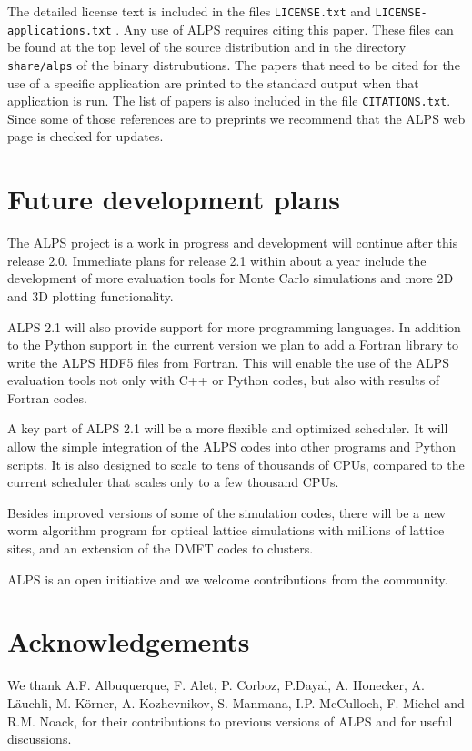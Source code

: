 \documentclass[12pt]{iopart}
\begin{document}
The detailed license text is included in the files {\tt LICENSE.txt} \cite{librarylicense} and {\tt LICENSE-applications.txt}  \cite{applicationlicense}. Any use of ALPS requires citing this paper.  These files can be found at the top level of the source distribution and in the directory {\tt share/alps} of the binary distrubutions. The papers that need to be cited for the use of a specific application are printed to the standard output when that application is run. The list of papers is also included in the file {\tt CITATIONS.txt}. Since some of those references are to preprints we recommend that the ALPS web page \cite{alps} is checked for updates.

\section{Future development plans}

The ALPS project is a work in progress and development will continue after this release 2.0. Immediate plans for release 2.1 within about a year include the development of  more evaluation tools for Monte Carlo simulations and more 2D and 3D plotting functionality.

ALPS 2.1 will also provide support for more programming languages. In addition to the Python support in the current version we plan to add a Fortran library to write the ALPS HDF5 files from Fortran. This will enable the use of the ALPS evaluation tools not only with C++ or Python codes, but also with results of Fortran codes.

A key part of ALPS 2.1 will be a more flexible and optimized scheduler. It will allow  the simple integration of the ALPS codes into other programs and Python scripts. It is also designed to scale to tens of thousands of CPUs, compared to the current scheduler that scales only to a few thousand CPUs. 

Besides improved versions of some of the simulation codes, there will be a new worm algorithm program for optical lattice simulations with millions of lattice sites, and an extension of the DMFT codes to clusters.

ALPS is an open initiative and we welcome contributions from the community.


\section{Acknowledgements}

We thank A.F. Albuquerque, F. Alet, P. Corboz, P.Dayal, A. Honecker, A. L\"auchli, M. K\"orner,  A. Kozhevnikov, S. Manmana, I.P. McCulloch, F. Michel and R.M. Noack, for their contributions to previous versions of ALPS and  for useful discussions. 
\end{document}
